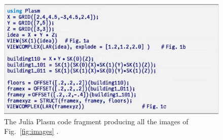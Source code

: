 \documentclass{juliacon}
\begin{document}
\begin{figure}[t!]
\begin{center}
\includegraphics[width=\linewidth]{figs/building-2.pdf}
\caption{The Julia {\sf Plasm} code fragment producing all the images of Fig.~\ref{fig:images} .}
\end{center}
\label{fig:plasmcode}
\end{figure}

\vadjust{\vfill\pagebreak}
\end{document}
